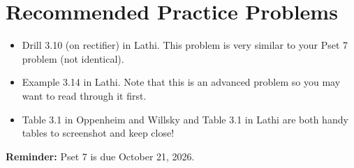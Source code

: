 \section{Recommended Practice Problems}

\begin{itemize}
    \item Drill 3.10 (on rectifier) in Lathi. This problem is very similar to your Pset 7 problem (not identical).
    \item Example 3.14 in Lathi. Note that this is an advanced problem so you may want to read through it first.
    \item Table 3.1 in Oppenheim and Willsky and Table 3.1 in Lathi are both handy tables to screenshot and keep close!
\end{itemize}

\textbf{Reminder:} Pset 7 is due October 21, 2026.
